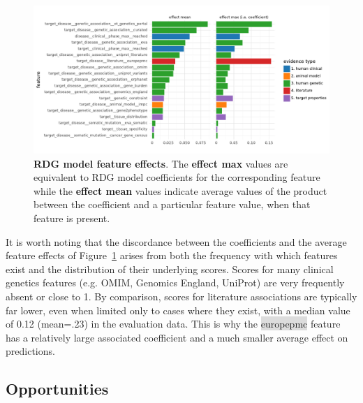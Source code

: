 \documentclass{article}
\begin{document}
\begin{figure}[!htb]
	\centering
  \captionsetup{width=.9\linewidth}
	\includegraphics[width=1\textwidth]{effect_sizes.pdf}
  \caption{
    \textbf{RDG model feature effects}. The \textbf{effect max} values are equivalent to RDG model coefficients for the corresponding feature while the \textbf{effect mean} values indicate average values of the product between the coefficient and a particular feature value, when that feature is present.
  }
	\label{fig:effect_sizes}
\end{figure}

It is worth noting that the discordance between the coefficients and the average feature effects of Figure~\ref{fig:effect_sizes} arises from both the frequency with which features exist and the distribution of their underlying scores. Scores for many clinical genetics features (e.g. OMIM, Genomics England, UniProt) are very frequently absent or close to 1. By comparison, scores for literature associations are typically far lower, even when limited only to cases where they exist, with a median value of 0.12 (mean=.23) in the evaluation data. This is why the \colorbox{Gainsboro}{europepmc} feature has a relatively large associated coefficient and a much smaller average effect on predictions.


\subsection{Opportunities}
\label{sec:results_opportunities}
\end{document}
